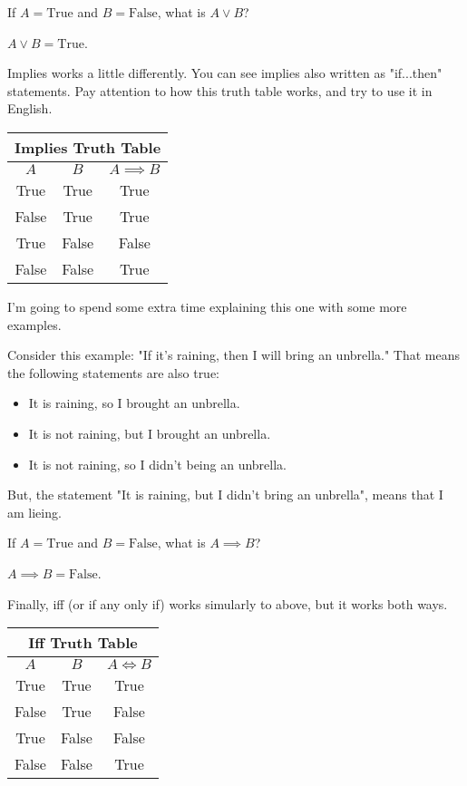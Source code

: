 \begin{boxexample}{}{}
	If $A=\text{True}$ and $B=\text{False}$, what is $A \lor B$?
	
	$A \lor B = \text{True}$.
\end{boxexample}

Implies works a little differently. You can see implies also written as "if...then" statements. Pay attention to how this truth table works, and try to use it in English.

\medskip
\begin{tabular}{c|c|c}
	\hline
	\multicolumn{3}{c}{Implies Truth Table}\\
	\hline
	$A$ & $B$ & $A \implies B$\\
	\hline
	True & True & True\\
	False & True & True\\
	True & False & False\\
	False & False & True\\
	\hline
\end{tabular}
\medskip

I'm going to spend some extra time explaining this one with some more examples.

\begin{boxexample}{}{}
	Consider this example: "If it's raining, then I will bring an unbrella." That means the following statements are also true:
	\begin{itemize}
		\item It is raining, so I brought an unbrella.
		\item It is not raining, but I brought an unbrella.
		\item It is not raining, so I didn't being an unbrella.
	\end{itemize}
	But, the statement "It is raining, but I didn't bring an unbrella", means that I am lieing.
\end{boxexample}

\begin{boxexample}{}{}
	If $A=\text{True}$ and $B=\text{False}$, what is $A \implies B$?
	
	$A \implies B = \text{False}$.
\end{boxexample}

Finally, iff (or if any only if) works simularly to above, but it works both ways.

\medskip
\begin{tabular}{c|c|c}
	\hline
	\multicolumn{3}{c}{Iff Truth Table}\\
	\hline
	$A$ & $B$ & $A \iff B$\\
	\hline
	True & True & True\\
	False & True & False\\
	True & False & False\\
	False & False & True\\
	\hline
\end{tabular}
\medskip

